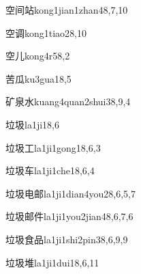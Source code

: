 \begin{verbete}{空间站}{kong1jian1zhan4}{8,7,10}
\end{verbete}

\begin{verbete}{空调}{kong1tiao2}{8,10}
\end{verbete}

\begin{verbete}{空儿}{kong4r5}{8,2}
\end{verbete}

\begin{verbete}{苦瓜}{ku3gua1}{8,5}
\end{verbete}

\begin{verbete}{矿泉水}{kuang4quan2shui3}{8,9,4}
\end{verbete}

\begin{verbete}{垃圾}{la1ji1}{8,6}
\end{verbete}

\begin{verbete}{垃圾工}{la1ji1gong1}{8,6,3}
\end{verbete}

\begin{verbete}{垃圾车}{la1ji1che1}{8,6,4}
\end{verbete}

\begin{verbete}{垃圾电邮}{la1ji1dian4you2}{8,6,5,7}
\end{verbete}

\begin{verbete}{垃圾邮件}{la1ji1you2jian4}{8,6,7,6}
\end{verbete}

\begin{verbete}{垃圾食品}{la1ji1shi2pin3}{8,6,9,9}
\end{verbete}

\begin{verbete}{垃圾堆}{la1ji1dui1}{8,6,11}
\end{verbete}

